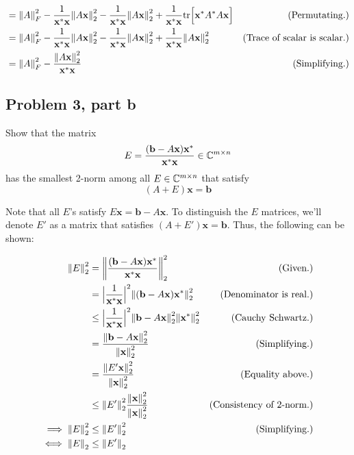 \begin{solution}
{\begin{align}
     &= \norm{A}_F^2 - \frac{1}{\textbf{x}^*\textbf{x}} \norm{A\textbf{x}}_2^2 - \frac{1}{\textbf{x}^*\textbf{x}} \norm{A\textbf{x}}_2^2 + \frac{1}{\textbf{x}^*\textbf{x}}\text{tr}\Big[ \textbf{x}^*A^*A\textbf{x}\Big] &\text{(Permutating.)}\nonumber\\
     &= \norm{A}_F^2 - \frac{1}{\textbf{x}^*\textbf{x}} \norm{A\textbf{x}}_2^2 - \frac{1}{\textbf{x}^*\textbf{x}} \norm{A\textbf{x}}_2^2 + \frac{1}{\textbf{x}^*\textbf{x}}\norm{A\textbf{x}}_2^2 &\text{(Trace of scalar is scalar.)}\nonumber\\
     &=\norm{A}_F^2 - \frac{\norm{A\textbf{x}}_2^2}{\textbf{x}^*\textbf{x}} &\text{(Simplifying.)}\nonumber
 \end{align}
 }%
 \alignbreak

\end{solution}

\newpage
\subsection{Problem 3, part b}
Show that the matrix 
\[
E = \frac{(\textbf{b} - A\textbf{x})\textbf{x}^*}{\textbf{x}^*\textbf{x}} \in \mathbb{C}^{m\times n}
\]
has the smallest 2-norm among all $E \in \mathbb{C}^{m\times n}$ that satisfy 
\[
(A + E) \textbf{x} = \textbf{b}
\]
\partbreak
\begin{solution}

 Note that all $E$'s satisfy $E\textbf{x} = \textbf{b} - A\textbf{x}$. To distinguish the $E$ matrices, we'll denote $E'$ as a matrix that satisfies $(A+E')\textbf{x} = \textbf{b}$. Thus, the following can be shown:

 \alignbreak
 \begin{align}
     \norm{E}_2^2 &= \norm{\frac{(\textbf{b} - A\textbf{x})\textbf{x}^*}{\textbf{x}^*\textbf{x}}}^2_2 &\text{(Given.)}\nonumber\\
     &= \Big| \frac{1}{\textbf{x}^*\textbf{x}}\Big|^2 \norm{(\textbf{b} - A\textbf{x})\textbf{x}^*}_2^2 &\text{(Denominator is real.)}\nonumber\\
     &\leq \Big| \frac{1}{\textbf{x}^*\textbf{x}}\Big|^2 \norm{\textbf{b} - A\textbf{x}}_2^2\norm{\textbf{x}^*}_2^2 &\text{(Cauchy Schwartz.)}\nonumber\\
     &= \frac{\norm{\textbf{b} - A\textbf{x}}_2^2}{\norm{\textbf{x}}^2_2} &\text{(Simplifying.)}\nonumber\\
     &= \frac{\norm{E'\textbf{x}}_2^2}{\norm{\textbf{x}}_2^2} &\text{(Equality above.)}\nonumber\\
     &\leq \norm{E'}_2^2 \frac{\norm{\textbf{x}}_2^2}{\norm{\textbf{x}}_2^2} &\text{(Consistency of 2-norm.)}\nonumber\\
     \implies \norm{E}_2^2&\leq \norm{E'}_2^2 &\text{(Simplifying.)}\nonumber\\
     \iff \norm{E}_2 &\leq \norm{E'}_2 \nonumber
 \end{align}
 \alignbreak
\end{solution}

